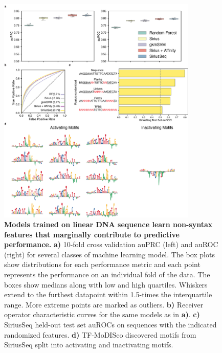 \begin{figure}[p]
    \centering
    \includegraphics[width=0.85\textwidth]{2_figures-and-files/SuppFig8.png}
    \caption[Models trained on linear DNA sequence learn non-syntax features that marginally contribute to predictive performance.]{\textbf{Models trained on linear DNA sequence learn non-syntax features that marginally contribute to predictive performance.} \textbf{a)} 10-fold cross validation auPRC (left) and auROC (right) for several classes of machine learning model. The box plots show distributions for each performance metric and each point represents the performance on an individual fold of the data. The boxes show medians along with low and high quartiles. Whiskers extend to the furthest datapoint within 1.5-times the interquartile range. More extreme points are marked as outliers. \textbf{b)} Receiver operator characteristic curves for the same models as in \textbf{a)}. \textbf{c)} SiriusSeq held-out test set auROCs on sequences with the indicated randomized features. \textbf{d)} TF-MoDISco discovered motifs from SiriusSeq split into activating and inactivating motifs.}
    \label{fig:2 supplementary_8}
\end{figure}

